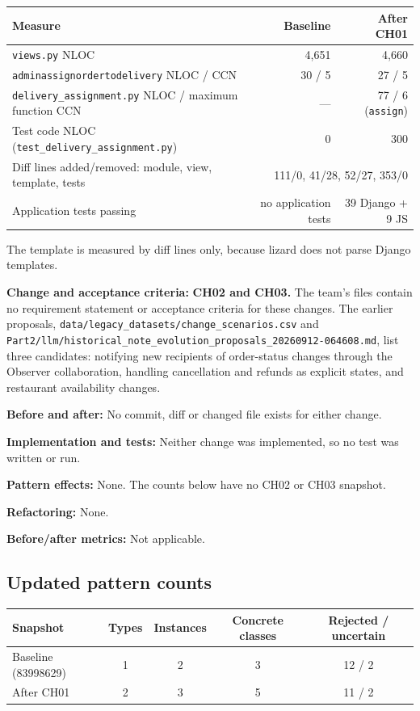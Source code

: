 \documentclass[11pt,a4paper]{article}
\newcommand{\entry}[1]{\par\textbf{#1:} }
\newcommand{\code}[1]{\nolinkurl{#1}}
\begin{document}
\begin{tabularx}{\linewidth}{@{}Xrr@{}}\toprule
Measure & Baseline & After CH01\\\midrule
\code{views.py} NLOC & 4{,}651 & 4{,}660\\
\code{adminassignordertodelivery} NLOC / CCN & 30 / 5 & 27 / 5\\
\code{delivery_assignment.py} NLOC / maximum function CCN & --- & 77 / 6 (\code{assign})\\
Test code NLOC (\code{test_delivery_assignment.py}) & 0 & 300\\
Diff lines added/removed: module, view, template, tests & \multicolumn{2}{r}{111/0, 41/28, 52/27, 353/0}\\
Application tests passing & no application tests & 39 Django + 9 JS\\\bottomrule
\end{tabularx}

The template is measured by diff lines only, because lizard does not parse Django templates.

\entry{Change and acceptance criteria}\textbf{CH02 and CH03.} The team's files contain no requirement statement or acceptance criteria for these changes. The earlier proposals, \code{data/legacy_datasets/change_scenarios.csv} and \code{Part2/llm/historical_note_evolution_proposals_20260912-064608.md}, list three candidates: notifying new recipients of order-status changes through the Observer collaboration, handling cancellation and refunds as explicit states, and restaurant availability changes.
\entry{Before and after}No commit, diff or changed file exists for either change.
\entry{Implementation and tests}Neither change was implemented, so no test was written or run.
\entry{Pattern effects}None. The counts below have no CH02 or CH03 snapshot.
\entry{Refactoring}None.
\entry{Before/after metrics}Not applicable.

\subsection{Updated pattern counts}\label{sec:counts}
\begin{tabularx}{\linewidth}{@{}Xcccc@{}}\toprule
Snapshot & Types & Instances & Concrete classes & Rejected / uncertain\\\midrule
Baseline (83998629) & 1 & 2 & 3 & 12 / 2\\
After CH01 & 2 & 3 & 5 & 11 / 2\\\bottomrule
\end{tabularx}
\end{document}
